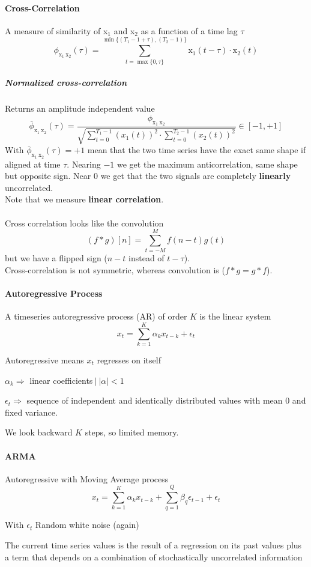 \documentclass[10pt]{report}
\begin{document}
\paragraph{Cross-Correlation} A measure of similarity of x$_1$ and x$_2$ as a function of a time lag $\tau$ $$\phi_{\text{x}_1\:\text{x}_2}(\tau)=\sum_{t = \max\{0,\tau\}}^{\min\{(T_1 - 1 + \tau), (T_2 - 1)\}} \text{x}_1(t-\tau)\cdot \text{x}_2(t)$$
\subparagraph{Normalized cross-correlation} Returns an amplitude independent value
$$\overline{\phi}_{\text{x}_1\:\text{x}_2}(\tau) = \frac{\phi_{\text{x}_1\:\text{x}_2}}{\sqrt{\sum_{t=0}^{T_1-1}(x_1(t))^2\cdot\sum_{t=0}^{T_2-1}(x_2(t))^2}} \in [-1,+1]$$
With $\overline{\phi}_{\text{x}_1\:\text{x}_2}(\tau) = +1$ mean that the two time series have the exact same shape if aligned at time $\tau$. Nearing $-1$ we get the maximum anticorrelation, same shape but opposite sign. Near 0 we get that the two signals are completely \textbf{linearly} uncorrelated.\\
Note that we measure \textbf{linear correlation}.\\\\
Cross correlation looks like the convolution $$(f * g)[n]=\sum_{t=-M}^M f(n-t)g(t)$$ but we have a flipped sign ($n-t$ instead of $t-\tau$).\\
Cross-correlation is not symmetric, whereas convolution is ($f * g = g * f$).
\paragraph{Autoregressive Process} A timeseries autoregressive process (AR) of order $K$ is the linear system $$x_t = \sum_{k=1}^K \alpha_k x_{t-k} + \epsilon_t$$\begin{list}{}{}
	\item Autoregressive means $x_t$ regresses on itself
	\item $\alpha_k \Rightarrow$ linear coefficients$\:|\:|\alpha|<1$
	\item $\epsilon_t\Rightarrow$ sequence of independent and identically distributed values with mean 0 and fixed variance.
	\item We look backward $K$ steps, so limited memory.
\end{list}
\paragraph{ARMA} Autoregressive with Moving Average process $$x_t = \sum_{k=1}^K \alpha_k x_{t-k} + \sum_{q=1}^Q \beta_q\epsilon_{t-1}+\epsilon_t$$
\begin{list}{}{}
	\item With $\epsilon_t$ Random white noise (again)
	\item The current time series values is the result of a regression on its past values plus a term that depends on a combination of stochastically uncorrelated information
\end{list}
\end{document}
